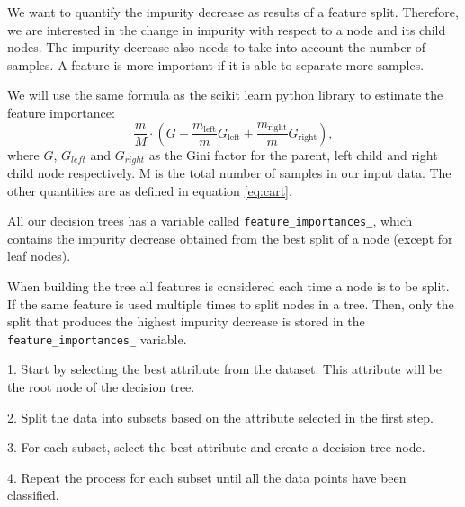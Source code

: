 We want to quantify the impurity decrease as results of a feature split.
Therefore, we are interested in the change in impurity with respect to a node and its
child nodes. The impurity decrease also needs to take into account the number
of samples. A feature is more important if it is able to separate more samples.       

We will use the same formula as the scikit learn python library \cite{sklearn}
to estimate the feature importance: 
\begin{equation*}
    \frac{m}{M} \cdot (G  - \frac{m_{\text{left}} }{m} G_{\text{left}}+
    \frac{m_{\text{right}} }{m} G_{\text{right}}), 
\end{equation*}
where $G$, $G_{left} $ and $G_{right} $ as the Gini factor for the parent,
left child and right child node respectively. M is the total number of samples
in our input data. The other quantities are as defined in equation
\ref{eq:cart}. 

All our decision trees has a variable called \verb|feature_importances_|, which
contains the impurity decrease obtained from the best split of a node (except
for leaf nodes).   

When building the tree all features is considered each time a node is to be
split. If the same feature is used multiple times to split nodes in a tree.
Then, only the split that produces the highest impurity decrease is stored in
the \verb|feature_importances_| variable.    



















1. Start by selecting the best attribute from the dataset. This attribute will be the root node of the decision 
tree. 

2. Split the data into subsets based on the attribute selected in the first step. 

3. For each subset, select the best attribute and create a decision tree node.

4. Repeat the process for each subset until all the data points have been classified.

